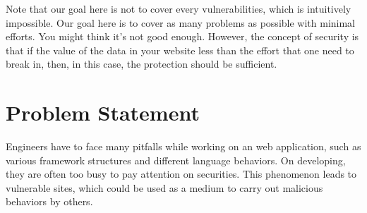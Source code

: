 \documentclass[conference]{IEEEtran}
\begin{document}
Note that our goal here is not to cover every vulnerabilities, which is intuitively impossible.
Our goal here is to cover as many problems as possible with minimal efforts.
You might think it's not good enough.
However, the concept of security is that if the value of the data in your website
less than the effort that one need to break in, then, in this case,
the protection should be sufficient.
%
%
%
%
%

\section{Problem Statement}
Engineers have to face many pitfalls while working on an web application, such as
various framework structures and different language behaviors.
On developing,
they are often too busy to pay attention on securities.
This phenomenon leads to vulnerable sites,
which could be used as a medium to carry out malicious behaviors by others.
\end{document}
